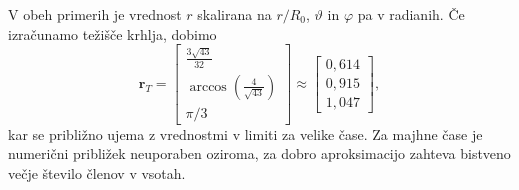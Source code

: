 \documentclass{article}
\def\phi{\varphi}
\def\theta{\vartheta}
\newcommand{\vect}[1]{\boldsymbol{#1}}
\begin{document}
V obeh primerih je vrednost $r$ skalirana na $r/R_0$, $\theta$ in $\phi$ pa v radianih.
Če izračunamo težišče krhlja, dobimo
\begin{equation}
\vect {r}_T=
\begin{bmatrix}
\frac{3\sqrt{43}}{32} \\
\arccos (\frac{4}{\sqrt{43}}) \\
\pi/3
\end{bmatrix}
\approx
\begin{bmatrix}
0,614 \\
0,915 \\
1,047
\end{bmatrix},
\end{equation}
kar se približno ujema z vrednostmi v limiti za velike čase.
Za majhne čase je numerični približek neuporaben oziroma, za dobro aproksimacijo zahteva bistveno večje število členov v vsotah.
\end{document}
